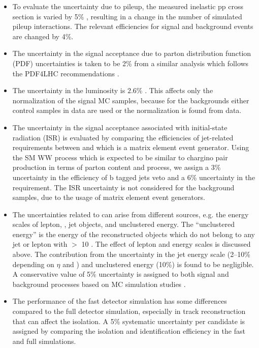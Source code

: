 \begin{itemize}
\item To evaluate the uncertainty due to pileup, the measured inelastic pp cross section is
  varied by 5\% \cite{Antchev:2011vs}, resulting in a change in the number of simulated pileup interactions.
 The relevant efficiencies for signal and background events are changed by 4\%.

\item The uncertainty in the signal acceptance due to parton distribution function (PDF) uncertainties 
  is taken to be 2\% from a similar analysis \cite{Khachatryan:2014qwa} which follows the PDF4LHC recommendations \cite{pdf4lhc}.

\item The uncertainty in the luminosity  is $2.6\%$ \cite{CMS-PAS-LUM-13-001}.  This affects only the
  normalization of the signal MC samples, because for the backgrounds  either control samples in data are used or the normalization is found from data.

\item The uncertainty in the signal acceptance associated with initial-state radiation (ISR)
is evaluated by comparing the efficiencies of jet-related requirements between \PYTHIA
 and \MADGRAPH which is a matrix element event generator. Using the SM WW process which
 is expected to be similar to chargino pair production in terms of parton content and process, we assign a 3\% uncertainty in 
the efficiency of  b tagged jets veto and a 6\% uncertainty in the \deltaphi requirement. The ISR
 uncertainty is not considered for the background samples, due to the usage of matrix element event generators.

\item The uncertainties related to \MPT can arise from different sources, e.g.  the energy scales of lepton, \Tau, jet 
objects, and unclustered energy.  The ``unclustered energy'' is the energy of the reconstructed objects which
 do not belong to any jet or lepton with \PT $>$ 10 \GeV. The effect of lepton and \Tau
 energy scales is discussed above. The contribution from the uncertainty in the jet energy scale (2--10\% depending on $\eta$  and \PT) and
 unclustered energy (10\%) is found to be negligible. A conservative value of 5\% uncertainty
 is assigned to both signal and background processes based on MC simulation studies \cite{Khachatryan:2015kxa, Khachatryan:2014qwa}.

\item The performance of the fast detector simulation has some differences compared to the full detector simulation, especially in
 track reconstruction \cite{Khachatryan:2015kxa} that can affect the \Tau isolation. A 5\% systematic uncertainty per
 \Tau candidate is assigned by comparing the \Tau isolation and identification efficiency in the fast
 and full simulations. 



\end{itemize}
